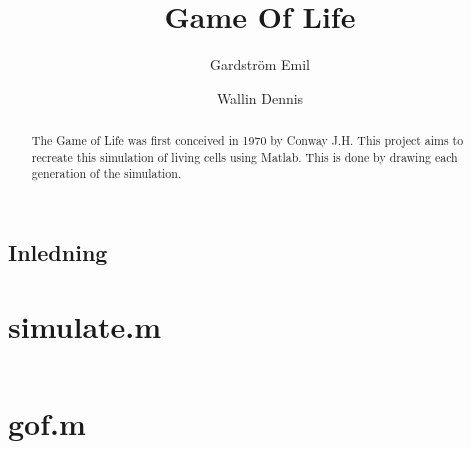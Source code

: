 \documentclass[]{scrreprt}
\title{Game Of Life}
\author{Gardström Emil \and Wallin Dennis}
\begin{document}
\maketitle

\begin{abstract}
	The Game of Life was first conceived in 1970 by Conway J.H. This project aims to recreate this simulation of living cells using Matlab. This is done by drawing each generation of the simulation.
\end{abstract}
\appendix
\section{Inledning}

\chapter{simulate.m}
\inputminted[linenos=true,frame=leftlines]{matlab}{src/simulate.m}
%
\chapter{gof.m}
\inputminted[linenos=true]{matlab}{src/gof.m}
%
\end{document}
